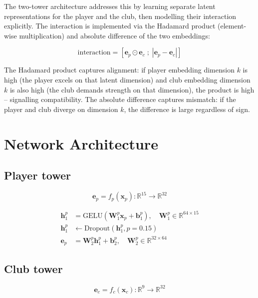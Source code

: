 \documentclass[12pt, a4paper, oneside]{report}
\begin{document}
The two-tower architecture addresses this by learning separate latent representations for the player and the club, then modelling their interaction explicitly. The interaction is implemented via the Hadamard product (element-wise multiplication) and absolute difference of the two embeddings:

\begin{equation}
\text{interaction} = [\mathbf{e}_p \odot \mathbf{e}_c \; ; \; |\mathbf{e}_p - \mathbf{e}_c|]
\end{equation}

The Hadamard product captures alignment: if player embedding dimension $k$ is high (the player excels on that latent dimension) and club embedding dimension $k$ is also high (the club demands strength on that dimension), the product is high -- signalling compatibility. The absolute difference captures mismatch: if the player and club diverge on dimension $k$, the difference is large regardless of sign.

\section{Network Architecture}

\subsection{Player tower}

\begin{equation}
\label{eq:player_tower}
\mathbf{e}_p = f_p(\mathbf{x}_p) : \mathbb{R}^{15} \to \mathbb{R}^{32}
\end{equation}

\begin{align*}
\mathbf{h}_1^p &= \text{GELU}(\mathbf{W}_1^p \mathbf{x}_p + \mathbf{b}_1^p), \quad \mathbf{W}_1^p \in \mathbb{R}^{64 \times 15} \\
\mathbf{h}_1^p &\leftarrow \text{Dropout}(\mathbf{h}_1^p, p=0.15) \\
\mathbf{e}_p    &= \mathbf{W}_2^p \mathbf{h}_1^p + \mathbf{b}_2^p, \quad \mathbf{W}_2^p \in \mathbb{R}^{32 \times 64}
\end{align*}

\subsection{Club tower}

\begin{equation}
\label{eq:club_tower}
\mathbf{e}_c = f_c(\mathbf{x}_c) : \mathbb{R}^{9} \to \mathbb{R}^{32}
\end{equation}
\end{document}
